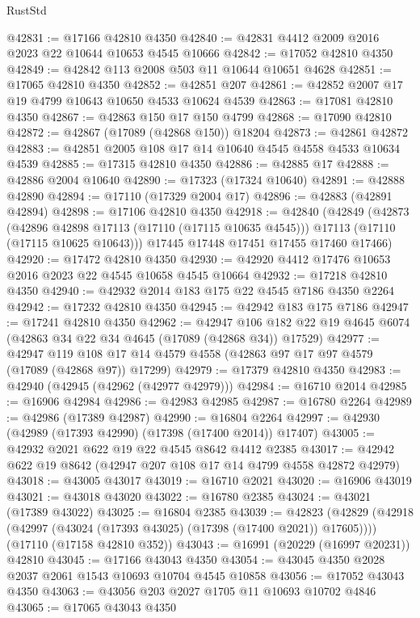 \begin{lexlean}{RustStd}
\begin{coremodule}
@42831 := @17166 @42810 @4350
@42840 := @42831 @4412 @2009 @2016 @2023 @22 @10644 @10653 @4545 @10666
@42842 := @17052 @42810 @4350
@42849 := @42842 @113 @2008 @503 @11 @10644 @10651 @4628
@42851 := @17065 @42810 @4350
@42852 := @42851 @207
@42861 := @42852 @2007 @17 @19 @4799 @10643 @10650 @4533 @10624 @4539
@42863 := @17081 @42810 @4350
@42867 := @42863 @150 @17 @150 @4799
@42868 := @17090 @42810
@42872 := @42867 (@17089 (@42868 @150)) @18204
@42873 := @42861 @42872
@42883 := @42851 @2005 @108 @17 @14 @10640 @4545 @4558 @4533 @10634 @4539
@42885 := @17315 @42810 @4350
@42886 := @42885 @17
@42888 := @42886 @2004 @10640
@42890 := @17323 (@17324 @10640)
@42891 := @42888 @42890
@42894 := @17110 (@17329 @2004 @17)
@42896 := @42883 (@42891 @42894)
@42898 := @17106 @42810 @4350
@42918 := @42840
    (@42849
      (@42873
        (@42896 @42898 @17113 (@17110 (@17115 @10635 @4545)))
        @17113
        (@17110 (@17115 @10625 @10643)))
      @17445
      @17448
      @17451
      @17455
      @17460
      @17466)
@42920 := @17472 @42810 @4350
@42930 := @42920 @4412 @17476 @10653 @2016 @2023 @22 @4545 @10658 @4545 @10664
@42932 := @17218 @42810 @4350
@42940 := @42932 @2014 @183 @175 @22 @4545 @7186 @4350 @2264
@42942 := @17232 @42810 @4350
@42945 := @42942 @183 @175 @7186
@42947 := @17241 @42810 @4350
@42962 := @42947
    @106
    @182
    @22
    @19
    @4645
    @6074
    (@42863 @34 @22 @34 @4645 (@17089 (@42868 @34)) @17529)
@42977 := @42947
    @119
    @108
    @17
    @14
    @4579
    @4558
    (@42863 @97 @17 @97 @4579 (@17089 (@42868 @97)) @17299)
@42979 := @17379 @42810 @4350
@42983 := @42940 (@42945 (@42962 (@42977 @42979)))
@42984 := @16710 @2014
@42985 := @16906 @42984
@42986 := @42983 @42985
@42987 := @16780 @2264
@42989 := @42986 (@17389 @42987)
@42990 := @16804 @2264
@42997 := @42930 (@42989 (@17393 @42990) (@17398 (@17400 @2014)) @17407)
@43005 := @42932 @2021 @622 @19 @22 @4545 @8642 @4412 @2385
@43017 := @42942 @622 @19 @8642 (@42947 @207 @108 @17 @14 @4799 @4558 @42872 @42979)
@43018 := @43005 @43017
@43019 := @16710 @2021
@43020 := @16906 @43019
@43021 := @43018 @43020
@43022 := @16780 @2385
@43024 := @43021 (@17389 @43022)
@43025 := @16804 @2385
@43039 := @42823
    (@42829 (@42918 (@42997 (@43024 (@17393 @43025) (@17398 (@17400 @2021)) @17605))))
    (@17110 (@17158 @42810 @352))
@43043 := @16991 (@20229 (@16997 @20231)) @42810
@43045 := @17166 @43043 @4350
@43054 := @43045 @4350 @2028 @2037 @2061 @1543 @10693 @10704 @4545 @10858
@43056 := @17052 @43043 @4350
@43063 := @43056 @203 @2027 @1705 @11 @10693 @10702 @4846
@43065 := @17065 @43043 @4350

\end{coremodule}
\end{lexlean}
